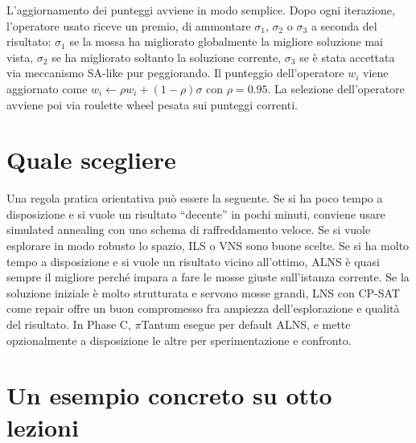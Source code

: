 L'aggiornamento dei punteggi avviene in modo semplice. Dopo
ogni iterazione, l'operatore usato riceve un premio, di
ammontare $\sigma_1$, $\sigma_2$ o $\sigma_3$ a seconda del
risultato: $\sigma_1$ se la mossa ha migliorato globalmente
la migliore soluzione mai vista, $\sigma_2$ se ha migliorato
soltanto la soluzione corrente, $\sigma_3$ se \`e stata
accettata via meccanismo SA-like pur peggiorando. Il
punteggio dell'operatore $w_i$ viene aggiornato come
$w_i \leftarrow \rho w_i + (1 - \rho) \sigma$ con
$\rho = 0.95$. La selezione dell'operatore avviene poi via
roulette wheel pesata sui punteggi correnti.

\section{Quale scegliere}

\begin{ideabox}
Una regola pratica orientativa pu\`o essere la seguente. Se
si ha poco tempo a disposizione e si vuole un risultato
``decente'' in pochi minuti, conviene usare simulated
annealing con uno schema di raffreddamento veloce. Se si
vuole esplorare in modo robusto lo spazio, ILS o VNS sono
buone scelte. Se si ha molto tempo a disposizione e si vuole
un risultato vicino all'ottimo, ALNS \`e quasi sempre il
migliore perch\'e impara a fare le mosse giuste sull'istanza
corrente. Se la soluzione iniziale \`e molto strutturata e
servono mosse grandi, LNS con CP-SAT come repair offre un
buon compromesso fra ampiezza dell'esplorazione e qualit\`a
del risultato. In Phase C, $\pi$Tantum esegue per default
ALNS, e mette opzionalmente a disposizione le altre per
sperimentazione e confronto.
\end{ideabox}

\section{Un esempio concreto su otto lezioni}

